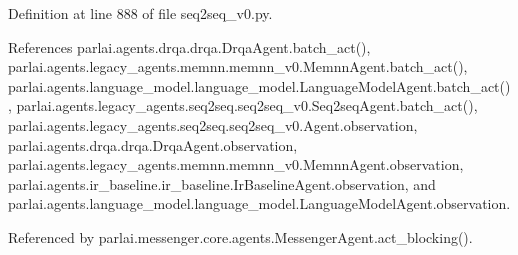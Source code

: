 Definition at line 888 of file seq2seq\+\_\+v0.\+py.



References parlai.\+agents.\+drqa.\+drqa.\+Drqa\+Agent.\+batch\+\_\+act(), parlai.\+agents.\+legacy\+\_\+agents.\+memnn.\+memnn\+\_\+v0.\+Memnn\+Agent.\+batch\+\_\+act(), parlai.\+agents.\+language\+\_\+model.\+language\+\_\+model.\+Language\+Model\+Agent.\+batch\+\_\+act(), parlai.\+agents.\+legacy\+\_\+agents.\+seq2seq.\+seq2seq\+\_\+v0.\+Seq2seq\+Agent.\+batch\+\_\+act(), parlai.\+agents.\+legacy\+\_\+agents.\+seq2seq.\+seq2seq\+\_\+v0.\+Agent.\+observation, parlai.\+agents.\+drqa.\+drqa.\+Drqa\+Agent.\+observation, parlai.\+agents.\+legacy\+\_\+agents.\+memnn.\+memnn\+\_\+v0.\+Memnn\+Agent.\+observation, parlai.\+agents.\+ir\+\_\+baseline.\+ir\+\_\+baseline.\+Ir\+Baseline\+Agent.\+observation, and parlai.\+agents.\+language\+\_\+model.\+language\+\_\+model.\+Language\+Model\+Agent.\+observation.



Referenced by parlai.\+messenger.\+core.\+agents.\+Messenger\+Agent.\+act\+\_\+blocking().

